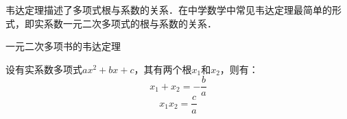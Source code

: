 
韦达定理描述了多项式根与系数的关系．在中学数学中常见韦达定理最简单的形式，即实系数一元二次多项式的根与系数的关系．

\begin{theorem}{一元二次多项书的韦达定理}\label{VietaF_the1}

设有实系数多项式$ax^2+bx+c$，其有两个根$x_1$和$x_2$，则有：
\begin{equation}
x_1+x_2 = -\frac{b}{a}
\end{equation}
\begin{equation}
x_1x_2 = \frac{c}{a}
\end{equation}

\end{theorem}
























